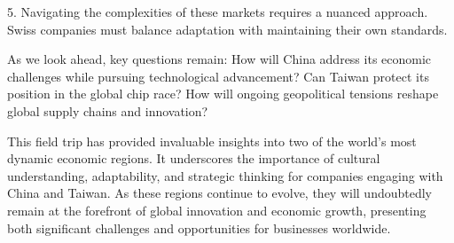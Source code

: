 5. Navigating the complexities of these markets requires a nuanced approach. Swiss companies must balance adaptation with maintaining their own standards.

As we look ahead, key questions remain: How will China address its economic challenges while pursuing technological advancement? Can Taiwan protect its position in the global chip race? How will ongoing geopolitical tensions reshape global supply chains and innovation?

This field trip has provided invaluable insights into two of the world's most dynamic economic regions. It underscores the importance of cultural understanding, adaptability, and strategic thinking for companies engaging with China and Taiwan. As these regions continue to evolve, they will undoubtedly remain at the forefront of global innovation and economic growth, presenting both significant challenges and opportunities for businesses worldwide.
